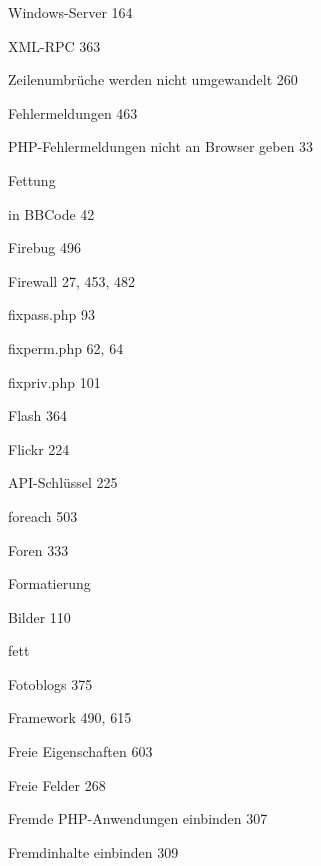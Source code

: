 \documentclass{book}
\renewcommand\subitem{\par}
\begin{document}
\begin{multicols}{2}
\begin{osp-index}
    \subitem Windows-Server\hspace{1mm} 164
    \subitem XML-RPC\hspace{1mm} 363
    \subitem Zeilenumbr\"uche werden nicht umgewandelt\hspace{1mm} 260
  \item Fehlermeldungen\hspace{1mm} 463
    \subitem PHP-Fehlermeldungen nicht an Browser geben\hspace{1mm} 33
  \item Fettung
    \subitem in BBCode\hspace{1mm} 42
  \item Firebug\hspace{1mm} 496
  \item Firewall\hspace{1mm} 27, 453, 482
  \item fixpass.php\hspace{1mm} 93
  \item fixperm.php\hspace{1mm} 62, 64
  \item fixpriv.php\hspace{1mm} 101
  \item Flash\hspace{1mm} 364
  \item Flickr\hspace{1mm} 224
    \subitem API-Schl\"ussel\hspace{1mm} 225
  \item foreach\hspace{1mm} 503
  \item Foren\hspace{1mm} 333
  \item Formatierung
    \subitem Bilder\hspace{1mm} 110
    \subitem fett\hspace{1mm} 
  \item Fotoblogs\hspace{1mm} 375
  \item Framework\hspace{1mm} 490, 615
  \item Freie Eigenschaften\hspace{1mm} 603
  \item Freie Felder\hspace{1mm} 268
  \item Fremde PHP-Anwendungen einbinden\hspace{1mm} 307
  \item Fremdinhalte einbinden\hspace{1mm} 309

\end{osp-index}
\end{multicols}
\end{document}
